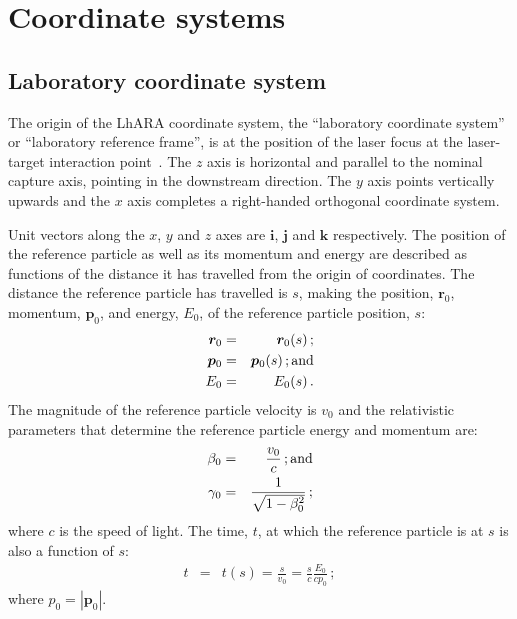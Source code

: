 \graphicspath{ {02-CoordinateSystems/Figures/} }

\section{Coordinate systems}

\subsection{Laboratory coordinate system}

The origin of the LhARA coordinate system, the ``laboratory coordinate
system'' or ``laboratory reference frame'', is at the position of the
laser focus at the laser-target interaction
point~\cite{LhARA:Baseline:September:2022}.
The $z$ axis is horizontal and parallel to the nominal capture axis,
pointing in the downstream direction.
The $y$ axis points vertically upwards and the $x$ axis completes a
right-handed orthogonal coordinate system. 

Unit vectors along the $x$, $y$ and $z$ axes are $\bm{i}$, $\bm{j}$
and $\bm{k}$ respectively.
The position of the reference particle as well as its momentum and
energy are described as functions of the distance it has travelled
from the origin of coordinates.
The distance the reference particle has travelled is $s$, making the
position, $\bm{r}_0$, momentum, $\bm{p}_0$, and energy, $E_0$, of the
reference particle position, $s$: 
\begin{eqnarray}
  \bm{r}_0 & = & \bm{r}_0(s)\, ;           \nonumber \\
  \bm{p}_0 & = & \bm{p}_0(s)\, {\rm ; and}           \\
       E_0 & = &      E_0(s)\, .           \nonumber
\end{eqnarray}
The magnitude of the reference particle velocity is $v_0$ and the
relativistic parameters that determine the reference particle energy
and momentum are:
\begin{eqnarray}
  \beta_0  & = & \frac{v_0}{c}                  \, {\rm ; and} \nonumber \\
  \gamma_0 & = & \frac{1}{\sqrt{1 - \beta^2_0}} \,; \nonumber
\end{eqnarray}
where $c$ is the speed of light.
The time, $t$, at which the reference particle is at $s$ is also a
function of $s$:
\begin{eqnarray}
        t  & = & t(s) = \frac{s}{v_0} = \frac{s}{c} \frac{E_0}{c p_0}\, ;
\end{eqnarray}
where $p_0=\left|\bm{p}_0\right|$.

